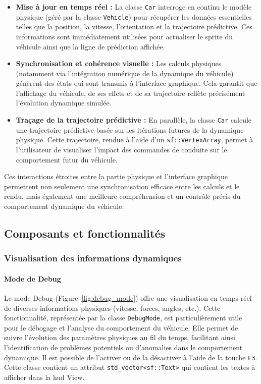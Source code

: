 \begin{itemize}
    \item \textbf{Mise à jour en temps réel :} La classe \texttt{Car} interroge en continu le modèle physique (géré par la classe \texttt{Vehicle}) pour récupérer les données essentielles telles que la position, la vitesse, l'orientation et la trajectoire prédictive.
    Ces informations sont immédiatement utilisées pour actualiser le \gls{sprite} du véhicule ainsi que la ligne de prédiction affichée.
    \item \textbf{Synchronisation et cohérence visuelle :} Les calculs physiques (notamment via l'intégration numérique de la dynamique du véhicule) génèrent des états qui sont transmis à l'interface graphique.
    Cela garantit que l'affichage du véhicule, de ses effets et de sa trajectoire reflète précisément l'évolution dynamique simulée.
    \item \textbf{Traçage de la trajectoire prédictive :} En parallèle, la classe \texttt{Car} calcule une trajectoire prédictive basée sur les itérations futures de la dynamique physique.
    Cette trajectoire, rendue à l'aide d'un \texttt{sf::VertexArray}\cite{sfml_sf_vertexarray}, permet à l'utilisateur de visualiser l'impact des commandes de conduite sur le comportement futur du véhicule.
\end{itemize}

Ces interactions étroites entre la partie physique et l'interface graphique permettent non seulement une synchronisation efficace entre les calculs et le rendu, mais également une meilleure compréhension et un contrôle précis du comportement dynamique du véhicule.


\subsection{Composants et fonctionnalités}\label{subsec:composants-et-fonctionnalites}

\subsubsection{Visualisation des informations dynamiques}\label{subsubsec:visualisation-des-informations-dynamiques}

\paragraph{Mode de Debug}
Le mode Debug (Figure~\ref{fig:debug_mode}) offre une visualisation en temps réel de diverses informations physiques (vitesse, forces, angles, etc.).
Cette fonctionnalité, représentée par la classe \texttt{DebugMode}, est particulièrement utile pour le débogage et l'analyse du comportement du véhicule.
Elle permet de suivre l'évolution des paramètres physiques au fil du temps, facilitant ainsi l'identification de problèmes potentiels ou d'anomalies dans le comportement dynamique.
Il est possible de l'activer ou de la désactiver à l'aide de la touche \texttt{F3}.
Cette classe contient un attribut \texttt{\gls{std_vector}<sf::Text>}\cite{cpp_reference_vector} qui contient les textes à afficher dans la \gls{hud} View.

